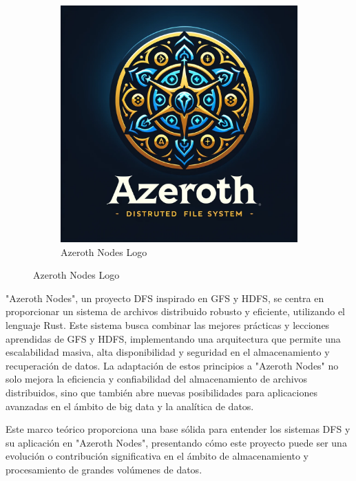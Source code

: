 \begin{figure}[H]
    \centering
    \begin{subfigure}[b]{0.5\textwidth}
        \centering
        \includegraphics[width=\textwidth]{Figures/1. Content/AzerothNodes.webp}
        \caption{Azeroth Nodes Logo}
        \label{fig: Azeroth Nodes Logo}
    \end{subfigure}
    \hfill
\end{figure}

"Azeroth Nodes", un proyecto DFS inspirado en GFS y HDFS, se centra en proporcionar un sistema de archivos distribuido robusto y eficiente, utilizando el lenguaje Rust. Este sistema busca combinar las mejores prácticas y lecciones aprendidas de GFS y HDFS, implementando una arquitectura que permite una escalabilidad masiva, alta disponibilidad y seguridad en el almacenamiento y recuperación de datos. La adaptación de estos principios a "Azeroth Nodes" no solo mejora la eficiencia y confiabilidad del almacenamiento de archivos distribuidos, sino que también abre nuevas posibilidades para aplicaciones avanzadas en el ámbito de big data y la analítica de datos.\newline \hfill \break

Este marco teórico proporciona una base sólida para entender los sistemas DFS y su aplicación en "Azeroth Nodes", presentando cómo este proyecto puede ser una evolución o contribución significativa en el ámbito de almacenamiento y procesamiento de grandes volúmenes de datos.